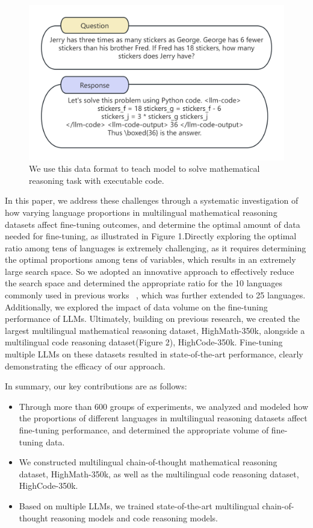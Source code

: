 \documentclass[11pt]{article}
\begin{document}
\begin{figure}[h]
\begin{center}
\includegraphics[width=1\linewidth]{picture/figure_1_data.png}
\end{center}
\caption{We use this data format to teach model to solve mathematical reasoning task with executable code.}
\end{figure}

In this paper, we address these challenges through a systematic investigation of how varying language proportions in multilingual mathematical reasoning datasets affect fine-tuning outcomes, and determine the optimal amount of data needed for fine-tuning, as illustrated in Figure 1.Directly exploring the optimal ratio among tens of languages is extremely challenging, as it requires determining the optimal proportions among tens of variables, which results in an extremely large search space. So we adopted an innovative approach to effectively reduce the search space and determined the appropriate ratio for the 10 languages commonly used in previous works ~\citep{zhu2024question,zhu2024power}, which was further extended to 25 languages. Additionally, we explored the impact of data volume on the fine-tuning performance of LLMs. Ultimately, building on previous research, we created the largest multilingual mathematical reasoning dataset, HighMath-350k, alongside a multilingual code reasoning dataset(Figure 2), HighCode-350k. Fine-tuning multiple LLMs on these datasets resulted in state-of-the-art performance, clearly demonstrating the efficacy of our approach.

In summary, our key contributions are as follows:

\begin{itemize}
    \item Through more than 600 groups of experiments, we analyzed and modeled how the proportions of different languages in multilingual reasoning datasets affect fine-tuning performance, and determined the appropriate volume of fine-tuning data.
    \item We constructed  multilingual chain-of-thought mathematical reasoning dataset, HighMath-350k, as well as the multilingual code reasoning dataset, HighCode-350k.
    \item Based on multiple LLMs, we trained state-of-the-art multilingual chain-of-thought reasoning models and code reasoning models.
\end{itemize}
\end{document}
